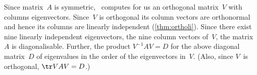 \begin{example}
\begin{solution}
Since matrix~\(A\) is symmetric, \script\ computes for us an orthogonal matrix~\(V\) with columns eigenvectors.
Since~\(V\) is orthogonal its column vectors are orthonormal and hence its columns are linearly independent (\autoref{thm:ortholi}).
Since there exist nine linearly independent eigenvectors, the nine column vectors of~\(V\), the matrix~\(A\) is diagonalisable.
Further, the product \(V^{-1}AV=D\) for the above diagonal matrix~\(D\) of eigenvalues in the order of the eigenvectors in~\(V\).
(Also, since \(V\)~is orthogonal, \(\tr VAV=D\).)
\end{solution}
\end{example}





